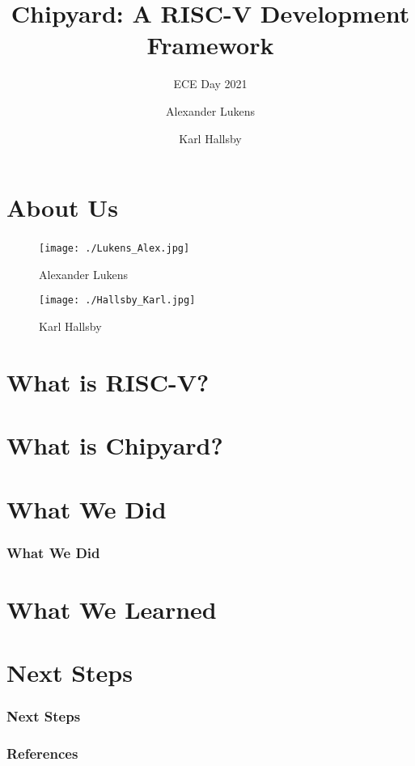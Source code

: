 \documentclass{eceday}
\title[Chipyard]{Chipyard: A RISC-V Development Framework}
\subtitle{ECE Day 2021}
\author{Alexander Lukens \and Karl Hallsby}
\institute{Illinois Institute of Technology}
\date{\DTMdisplaydate{2021}{4}{9}{-1}}
\begin{document}
\nocite{chipyard}

\begin{frame}
  \titlepage{}
\end{frame}

\section{About Us}\label{sec:About_Us}
\begin{frame}
  \frametitle{}
  \begin{figure}[h!tbp]
    \centering
    \texttt{[image: ./Lukens\_Alex.jpg]}
    \caption*{Alexander Lukens}
    \label{fig:Alex_Lukens}
  \end{figure}
  \begin{figure}[h!tbp]
    \centering
    \texttt{[image: ./Hallsby\_Karl.jpg]}
    \caption*{Karl Hallsby}
    \label{fig:Karl_Hallsby}
  \end{figure}
\end{frame}

\section{What is RISC-V?}\label{sec:What_is_RISC-V}
\begin{frame}
  \frametitle{}
\end{frame}

\section{What is Chipyard?}\label{sec:What_is_Chipyard}
\begin{frame}
  \frametitle{}
\end{frame}

\section{What We Did}\label{sec:What_We_Did}
\begin{frame}
  \frametitle{What We Did}
\end{frame}

\section{What We Learned}\label{sec:What_We_Learned}
\begin{frame}
  \frametitle{}
\end{frame}

\section{Next Steps}\label{sec:Next_Steps}
\begin{frame}
  \frametitle{Next Steps}
\end{frame}

\begin{frame}
  \frametitle{References}

  \printbibliography[heading=bibintoc]{}
\end{frame}
\end{document}
